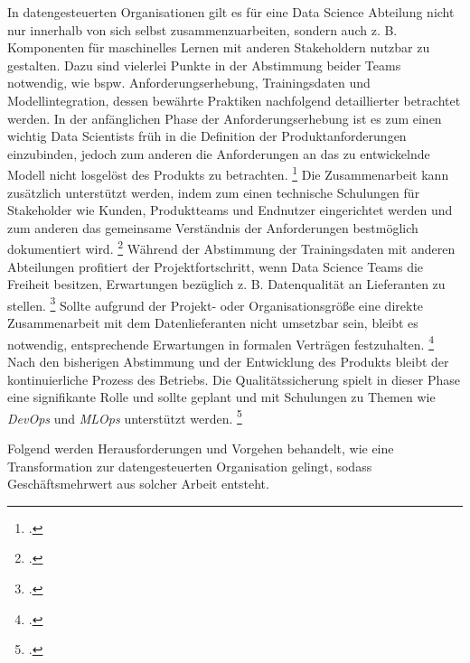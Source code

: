 In datengesteuerten Organisationen gilt es für eine Data Science Abteilung nicht nur innerhalb von sich selbst zusammenzuarbeiten, sondern auch z. B. Komponenten für maschinelles Lernen mit anderen Stakeholdern nutzbar zu gestalten.
Dazu sind vielerlei Punkte in der Abstimmung beider Teams notwendig, wie bspw. Anforderungserhebung, Trainingsdaten und Modellintegration, dessen bewährte Praktiken nachfolgend detaillierter betrachtet werden.
In der anfänglichen Phase der Anforderungserhebung ist es zum einen wichtig Data Scientists früh in die Definition der Produktanforderungen einzubinden, jedoch zum anderen die Anforderungen an das zu entwickelnde Modell nicht losgelöst des Produkts zu betrachten. \footcite[Vgl.][S. 418]{Nahar.2022}
Die Zusammenarbeit kann zusätzlich unterstützt werden, indem zum einen technische Schulungen für Stakeholder wie Kunden, Produktteams und Endnutzer eingerichtet werden und zum anderen das gemeinsame Verständnis der Anforderungen bestmöglich dokumentiert wird. \footcite[Vgl.][S. 418]{Nahar.2022}
Während der Abstimmung der Trainingsdaten mit anderen Abteilungen profitiert der Projektfortschritt, wenn Data Science Teams die Freiheit besitzen, Erwartungen bezüglich z. B. Datenqualität an Lieferanten zu stellen. \footcite[Vgl.][S. 420]{Nahar.2022}
Sollte aufgrund der Projekt- oder Organisationsgröße eine direkte Zusammenarbeit mit dem Datenlieferanten nicht umsetzbar sein, bleibt es notwendig, entsprechende Erwartungen in formalen Verträgen festzuhalten. \footcite[Vgl.][S. 420]{Nahar.2022}
Nach den bisherigen Abstimmung und der Entwicklung des Produkts bleibt der kontinuierliche Prozess des Betriebs.
Die Qualitätssicherung spielt in dieser Phase eine signifikante Rolle und sollte geplant und mit Schulungen zu Themen wie \textit{DevOps} und \textit{MLOps} unterstützt werden. \footcite[Vgl.][S. 423]{Nahar.2022}

Folgend werden Herausforderungen und Vorgehen behandelt, wie eine Transformation zur datengesteuerten Organisation gelingt, sodass Geschäftsmehrwert aus solcher Arbeit entsteht.

